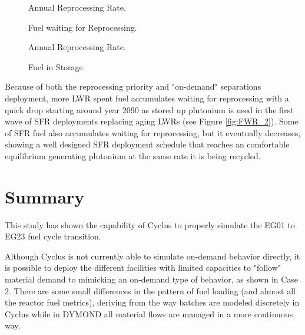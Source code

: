 \documentclass[12pt]{article}
\begin{document}
\begin{figure}[h!]
    \centering
    \caption{Annual Reprocessing Rate.}
    \label{fig:ARR_1}
\end{figure}
\begin{figure}[h!]
    \centering
    \caption{Fuel waiting for Reprocessing.\label{fig:ARR_FWR_SFC} }
\end{figure}
\begin{figure}[h!]
    \centering
    \caption{Annual Reprocessing Rate.\label{fig:ARR_FWR_SFC_2} }
\end{figure}
\begin{figure}[h!]
    \centering
    \caption{Fuel in Storage.\label{fig:ARR_FWR_SFC_2} }
\end{figure}
Because of both the reprocessing priority and "on-demand" separations
deployment, more LWR spent fuel accumulates waiting for reprocessing with a quick drop
starting around year 2090 as stored up plutonium is used in the first wave of
SFR deployments replacing aging LWRs (see Figure \ref{fig:FWR_2}). Some of SFR fuel also accumulates
waiting for reprocessing, but it eventually decreases, showing a well designed SFR
deployment schedule that reaches an comfortable equilibrium generating
plutonium at the same rate it is being recycled.

\section{Summary}

This study has shown the capability of Cyclus to properly simulate the EG01 to
EG23 fuel cycle transition.   

Although Cyclus is not currently able to simulate on-demand behavior directly,
it is possible to deploy the different facilities with limited capacities to
"follow" material demand to mimicking an on-demand type of behavior, as shown in
Case 2. There are some small differences in the pattern of fuel
loading (and almost all the reactor fuel metrics), deriving from the way
batches are modeled discretely in Cyclus while in DYMOND all 
material flows are managed in a more continuous way.
\end{document}
